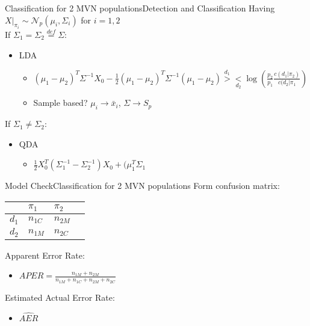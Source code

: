 \documentclass[aspectratio=169,10pt,t]{beamer}
\begin{document}
\begin{frame}{Classification for 2 MVN populations}{Detection and Classification}
    Having $X|_{\pi_i} \sim \mathcal{N}_p(\mu_i, \Sigma_i)$ for $i = 1, 2$ \\
    If $\Sigma_1 = \Sigma_2 \overset{def}{=} \Sigma$:
    \begin{itemize}
        \item LDA
        \begin{itemize}
            \item $(\mu_1 - \mu_2)^T \Sigma^{-1}X_0 - \frac{1}{2}(\mu_1 - \mu_2)^T \Sigma^{-1}(\mu_1 - \mu_2) \overset{d_1}{>}\underset{d_2}{<} \log(\frac{p_2}{p_1} \frac{c(d_1 | \pi_2)}{c(d_2 | \pi_1})$
            \item Sample based? $\mu_i \rightarrow \bar{x}_i$, $\Sigma \rightarrow S_p$
        \end{itemize}
    \end{itemize}
    If $\Sigma_1 \neq \Sigma_2$:
    \begin{itemize}
        \item QDA
        \begin{itemize}
            \item $\frac{1}{2} X_0^T(\Sigma_1^{-1} - \Sigma_2^{-1})X_0 + (\mu_1^T\Sigma_1 $
        \end{itemize}
    \end{itemize}
\end{frame}

\begin{frame}{Model Check}{Classification for 2 MVN populations}
    Form confusion matrix: \\
        \begin{table}[h]
        \begin{tabular}{@{}llll@{}}
        \toprule
              & $\pi_1$          & $\pi_2$          \\ \midrule
        $d_1$ & $n_{1C}$ & $n_{2M}$ \\
        $d_2$ & $n_{1M}$ & $n_{2C}$ \\ \midrule 
        \end{tabular}
        \end{table}
    Apparent Error Rate: 
    \begin{itemize}
        \item $APER = \frac{n_{1M} + n_{2M}}{n_{1M} + n_{1C} + n_{2M} + n_{2C}}$
    \end{itemize}
    Estimated Actual Error Rate:
    \begin{itemize}
        \item $\hat{AER}$ 
    \end{itemize}
\end{frame}
\end{document}
